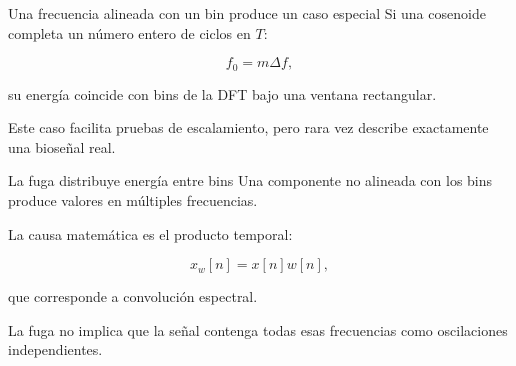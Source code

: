 \documentclass[
  ignorenonframetext,
  aspectratio=169,
  spanish,
]{beamer}
\providecommand{\faExclamation}{\faIcon{exclamation}}
\begin{document}
\begin{frame}{Una frecuencia alineada con un bin produce un caso
    especial}
  \protect{}\label{una-frecuencia-alineada-con-un-bin-produce-un-caso-especial}
  Si una cosenoide completa un número entero de ciclos en \(T\):

  \[f_0=m\Delta f,\]

  su energía coincide con bins de la DFT bajo una ventana rectangular.

  \begin{tcolorbox}[enhanced jigsaw, arc=.35mm, bottomrule=.15mm, bottomtitle=1mm, breakable, colback=white, colbacktitle=quarto-callout-note-color!10!white, colframe=quarto-callout-note-color-frame, coltitle=black, left=2mm, leftrule=.75mm, opacityback=0, opacitybacktitle=0.6, rightrule=.15mm, title=\textcolor{quarto-callout-note-color}{\faInfo}\hspace{0.5em}{Nota}, titlerule=0mm, toprule=.15mm, toptitle=1mm]

    Este caso facilita pruebas de escalamiento, pero rara vez describe
    exactamente una bioseñal real.

  \end{tcolorbox}
\end{frame}

\begin{frame}{La fuga distribuye energía entre bins}
  \protect{}\label{la-fuga-distribuye-energuxeda-entre-bins}
  Una componente no alineada con los bins produce valores en múltiples
  frecuencias.

  La causa matemática es el producto temporal:

  \[x_w[n]=x[n]w[n],\]

  que corresponde a convolución espectral.

  \begin{tcolorbox}[enhanced jigsaw, arc=.35mm, bottomrule=.15mm, bottomtitle=1mm, breakable, colback=white, colbacktitle=quarto-callout-important-color!10!white, colframe=quarto-callout-important-color-frame, coltitle=black, left=2mm, leftrule=.75mm, opacityback=0, opacitybacktitle=0.6, rightrule=.15mm, title=\textcolor{quarto-callout-important-color}{\faExclamation}\hspace{0.5em}{Importante}, titlerule=0mm, toprule=.15mm, toptitle=1mm]

    La fuga no implica que la señal contenga todas esas frecuencias como
    oscilaciones independientes.

  \end{tcolorbox}
\end{frame}
\end{document}
